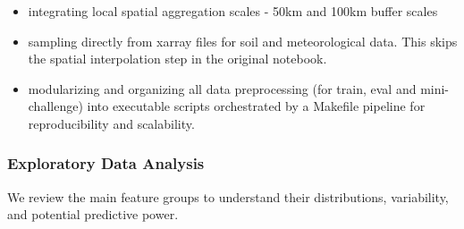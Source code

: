 \documentclass[ruler]{CUP-JNL-EDS}%
\begin{document}
\begin{itemize}
    \item integrating local spatial aggregation scales - 50km and 100km buffer scales
    \item sampling directly from xarray files for soil and meteorological data. This skips the spatial
    interpolation step in the original notebook. 
    \item modularizing and organizing all data preprocessing (for train, eval and mini-challenge) 
    into executable scripts orchestrated by a Makefile pipeline for reproducibility and scalability.
\end{itemize} 

\subsubsection{Exploratory Data Analysis}
We review the main feature groups to understand their distributions, variability, and potential predictive power.
\end{document}

